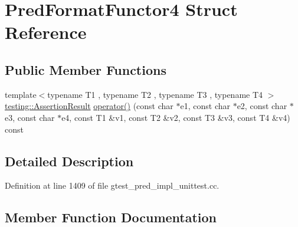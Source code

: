 \hypertarget{struct_pred_format_functor4}{}\section{Pred\+Format\+Functor4 Struct Reference}
\label{struct_pred_format_functor4}
\subsection*{Public Member Functions}
\begin{DoxyCompactItemize}
\item 
{\footnotesize template$<$typename T1 , typename T2 , typename T3 , typename T4 $>$ }\\\hyperlink{classtesting_1_1_assertion_result}{testing\+::\+Assertion\+Result} \hyperlink{struct_pred_format_functor4_a006f7a2c91db1288b68b5c44614dc4d7}{operator()} (const char $\ast$e1, const char $\ast$e2, const char $\ast$e3, const char $\ast$e4, const T1 \&v1, const T2 \&v2, const T3 \&v3, const T4 \&v4) const 
\end{DoxyCompactItemize}


\subsection{Detailed Description}


Definition at line 1409 of file gtest\+\_\+pred\+\_\+impl\+\_\+unittest.\+cc.



\subsection{Member Function Documentation}

